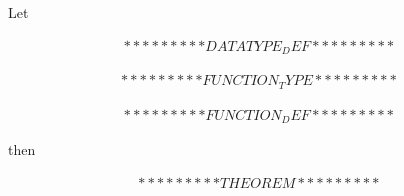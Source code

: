 \documentclass[a4paper]{article}
\begin{document}
\pagestyle{empty}

\begin{center}


\fontsize{18}{5}\selectfont
Let\\
\vspace{0.65cm}

\begin{eqnarray*}
*********DATATYPE_DEF*********
\end{eqnarray*}

\begin{eqnarray*}
*********FUNCTION_TYPE*********
\end{eqnarray*}

\begin{eqnarray*}
*********FUNCTION_DEF*********
\end{eqnarray*}

\vspace{0.3cm}
then

\fontsize{20}{5}\selectfont
\begin{eqnarray*}
*********THEOREM*********
\end{eqnarray*}

\end{center}
\end{document}
